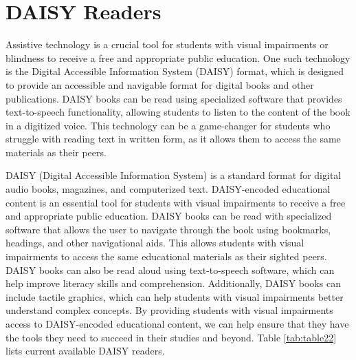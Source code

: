\documentclass[12pt,letterpaper,twoside]{extreport}
\begin{document}
\pagebreak \hypertarget{text-to-speech-music-podcast}{}\section{DAISY Readers}\label{text-to-speech-music-podcast}

Assistive technology is a crucial tool for students with visual impairments or blindness to receive a free and appropriate public education. One such technology is the Digital Accessible Information System (DAISY) format, which is designed to provide an accessible and navigable format for digital books and other publications. DAISY books can be read using specialized software that provides text-to-speech functionality, allowing students to listen to the content of the book in a digitized voice. This technology can be a game-changer for students who struggle with reading text in written form, as it allows them to access the same materials as their peers.

DAISY (Digital Accessible Information System) is a standard format for digital audio books, magazines, and computerized text. DAISY-encoded educational content is an essential tool for students with visual impairments to receive a free and appropriate public education. DAISY books can be read with specialized software that allows the user to navigate through the book using bookmarks, headings, and other navigational aids. This allows students with visual impairments to access the same educational materials as their sighted peers. DAISY books can also be read aloud using text-to-speech software, which can help improve literacy skills and comprehension. Additionally, DAISY books can include tactile graphics, which can help students with visual impairments better understand complex concepts. By providing students with visual impairments access to DAISY-encoded educational content, we can help ensure that they have the tools they need to succeed in their studies and beyond. Table \ref{tab:table22} lists current available DAISY readers.
\end{document}
